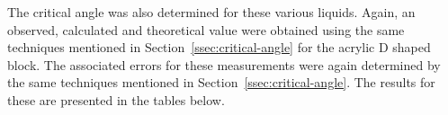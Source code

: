 \documentclass{article}
\newcommand{\secref}[2][Section~]{#1\ref{#2}}
\begin{document}
\vspace{10mm}
\noindent
The critical angle was also determined for these various liquids. Again, an observed, calculated and theoretical value were obtained using the same techniques mentioned in \secref{ssec:critical-angle} for the acrylic D shaped block. The associated errors for these measurements were again determined by the same techniques mentioned in \secref{ssec:critical-angle}. The results for these are presented in the tables below.




\end{document}
